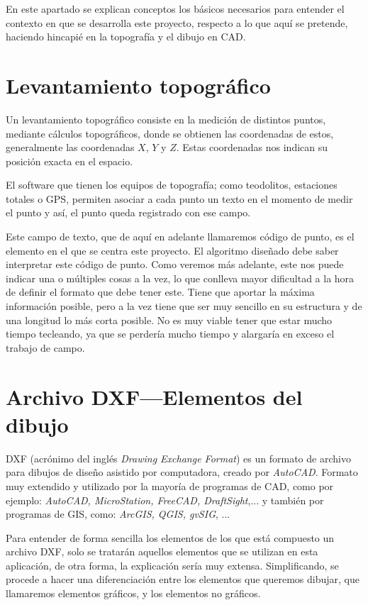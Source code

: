 
En este apartado se explican conceptos los básicos necesarios para entender el contexto en que se desarrolla este proyecto, respecto a lo que aquí se pretende, haciendo hincapié en la topografía y el dibujo en CAD. 

\section{Levantamiento topográfico}

Un levantamiento topográfico consiste en la medición de distintos puntos, mediante cálculos topográficos, donde se obtienen las coordenadas de estos, generalmente las coordenadas $X$, $Y$ y $Z$. Estas coordenadas nos indican su posición exacta en el espacio. 

El software que tienen los equipos de topografía; como teodolitos, estaciones totales o GPS, permiten asociar a cada punto un texto en el momento de medir el punto y así, el punto queda registrado con ese campo.

Este campo de texto, que de aquí en adelante llamaremos código de punto, es el elemento en el que se centra este proyecto. El algoritmo diseñado debe saber interpretar este código de punto. Como veremos más adelante, este nos puede indicar una o múltiples cosas a la vez, lo que conlleva mayor dificultad a la hora de definir el formato que debe tener este. Tiene que aportar la máxima información posible, pero a la vez tiene que ser muy sencillo en su estructura y de una longitud lo más corta posible. No es muy viable tener que estar mucho tiempo tecleando, ya que se perdería mucho tiempo y alargaría en exceso el trabajo de campo.

\section{Archivo DXF---Elementos del dibujo}

DXF (acrónimo del inglés \emph{Drawing Exchange Format}) es un formato de archivo para dibujos de diseño asistido por computadora, creado por \emph{AutoCAD}. Formato muy extendido y utilizado por la mayoría de programas de CAD, como por ejemplo: \emph{AutoCAD, MicroStation, FreeCAD, DraftSight},... y también por programas de GIS, como: \emph{ArcGIS, QGIS, gvSIG}, ...

Para entender de forma sencilla los elementos de los que está compuesto un archivo DXF, solo se tratarán aquellos elementos que se utilizan en esta aplicación, de otra forma, la explicación sería muy extensa.
Simplificando, se procede a hacer una diferenciación entre los elementos que queremos dibujar, que llamaremos elementos gráficos, y los elementos no gráficos.

